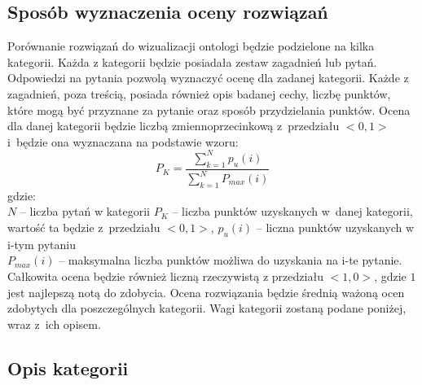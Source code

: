 \subsection*{Sposób wyznaczenia oceny rozwiązań}
Porównanie rozwiązań do wizualizacji ontologi będzie podzielone na kilka kategorii. Każda z kategorii będzie posiadała zestaw zagadnień lub pytań. 
Odpowiedzi na pytania pozwolą wyznaczyć ocenę dla zadanej kategorii. Każde z zagadnień, poza treścią, posiada również opis badanej cechy, liczbę 
punktów, które mogą być przyznane za pytanie oraz sposób przydzielania punktów. Ocena dla danej kategorii będzie liczbą zmiennoprzecinkową 
z~przedziału $ <0,1> $  i~będzie ona wyznaczana na podstawie wzoru:
\begin{equation}
   {P_{K}} =\frac{\sum_{k=1}^N  {p_{u}(i)}}{\sum_{k=1}^N  {P_{max}(i)}} 
\end{equation}
gdzie: \\
$ N $ -- liczba pytań w kategorii \newline
$ P_{K} $ -- liczba punktów uzyskanych w~danej kategorii, wartość ta będzie z~przedziału $ <0,1> $,\newline
$ p_{u}(i) $ -- liczna punktów uzyskanych w i-tym pytaniu \\
$ P_{max}(i) $ -- maksymalna liczba punktów możliwa do uzyskania na i-te pytanie. \\


Całkowita ocena będzie również liczną rzeczywistą z przedziału $ <1,0> $, gdzie $1$ jest najlepszą notą do zdobycia. Ocena rozwiązania będzie średnią 
ważoną ocen zdobytych dla poszczególnych kategorii. Wagi kategorii zostaną podane poniżej, wraz z~ich opisem. 

\subsection*{Opis kategorii}

